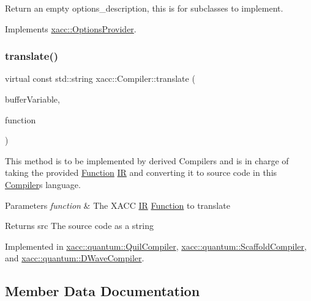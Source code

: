 Return an empty options\+\_\+description, this is for subclasses to implement. 

Implements \hyperlink{a01195_a6d150954f852109bfe2c1ae90222926f}{xacc\+::\+Options\+Provider}.

\mbox{\label{a01103_aeedbe58a33fed29e4d7694ae743e25e7}} 
\subsubsection{\texorpdfstring{translate()}{translate()}}
{\footnotesize\ttfamily virtual const std\+::string xacc\+::\+Compiler\+::translate (\begin{DoxyParamCaption}\item[{const std\+::string \&}]{buffer\+Variable,  }\item[{std\+::shared\+\_\+ptr$<$ \hyperlink{a01127}{Function} $>$}]{function }\end{DoxyParamCaption})\hspace{0.3cm}{\ttfamily [pure virtual]}}

This method is to be implemented by derived Compilers and is in charge of taking the provided \hyperlink{a01127}{Function} \hyperlink{a01151}{IR} and converting it to source code in this \hyperlink{a01103}{Compiler}\textquotesingle{}s language.


\begin{DoxyParams}{Parameters}
{\em function} & The X\+A\+CC \hyperlink{a01151}{IR} \hyperlink{a01127}{Function} to translate \\
\hline
\end{DoxyParams}
\begin{DoxyReturn}{Returns}
src The source code as a string 
\end{DoxyReturn}


Implemented in \hyperlink{a00911_a66ca00bbb1f30e7bc6dd86b1e267b93b}{xacc\+::quantum\+::\+Quil\+Compiler}, \hyperlink{a00935_ac7ca2941e987ba579c6f50cfbd7fb0dc}{xacc\+::quantum\+::\+Scaffold\+Compiler}, and \hyperlink{a00947_a73a8839c55d22c68e5264feca8d626d4}{xacc\+::quantum\+::\+D\+Wave\+Compiler}.



\subsection{Member Data Documentation}
\mbox{\label{a01103_ad4cbb467fa7e377bac6c054ffcb22b7c}} 
